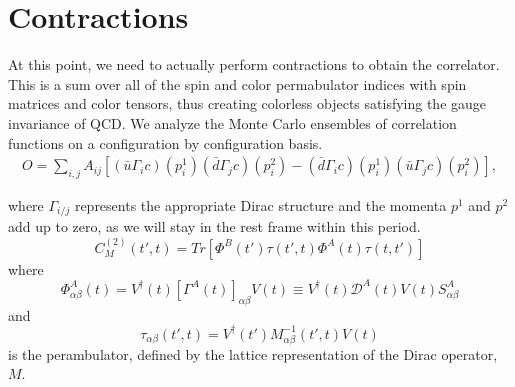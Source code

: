\section{Contractions}
At this point, we need to actually perform contractions to obtain the correlator. This is a sum over all of the spin and color permabulator indices with spin matrices and color tensors, thus creating colorless objects satisfying the gauge invariance of QCD. We analyze the Monte Carlo ensembles of correlation functions on a configuration by configuration basis. 
\begin{align}
    \label{ops_cc}
    O=\sum_{i,j} A_{ij}  [(\bar u\Gamma_i c)( p^1_{i})(\bar d\Gamma_{j} c)(p^2_{i}) -  (\bar d \Gamma_i c)({ p^1_{i}})(\bar u\Gamma_{j} c)({ p^2_{i}}) ]\nonumber,
    \end{align}

    where $\Gamma_{i/j}$ represents the appropriate Dirac structure and the momenta $p^1$ and $p^2$ add up to zero, as we will stay in the rest frame within this period. 
$$C_M^{(2)}(t',t) = Tr[\Phi^B(t')\tau(t',t)\Phi^A(t)\tau(t,t')]$$ 
where 
$$\Phi^A_{\alpha\beta}(t) = V^{\dagger}(t) [\Gamma^A(t)]_{\alpha\beta} V(t) \equiv V^{\dagger}(t)\mathcal{D}^A(t)V(t)S^A_{\alpha\beta}$$ 
and 
$$\tau_{\alpha\beta}(t',t) = V^{\dagger}(t')M_{\alpha\beta}^{-1}(t',t)V(t)$$ 
is the perambulator, defined by the lattice representation of the Dirac operator, $M$. 

